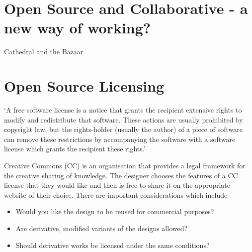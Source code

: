 % 
% 
% 
% 
% 

\section{Open Source and Collaborative - a new way of working?}




Cathedral and the Bazaar 

\section{Open Source Licensing}
\label{licensing}

`A free software license is a notice that grants the recipient extensive rights to modify and redistribute that software. These actions are usually prohibited by copyright law, but the rights-holder (usually the author) of a piece of software can remove these restrictions by accompanying the software with a software license which grants the recipient these rights.'

Creative Commons (CC) is an organisation that provides a legal framework for the creative sharing of knowledge. The designer chooses the features of a CC license that they would like and then is free to share it on the appropriate website of their choice. There are important considerations which include
\begin{itemize}
 \item Would you like the design to be reused for commercial purposes? 
 \item Are derivative, modified variants of the designs allowed?
 \item Should derivative works be licensed under the same conditions?
\end{itemize}


